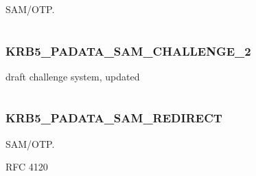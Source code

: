 \documentclass[letterpaper,10pt,english]{sphinxmanual}
\begin{document}
SAM/OTP.

\begin{tabulary}{\linewidth}{|L|L|}
\hline

 & 
\\
\hline\end{tabulary}



\subsubsection{KRB5\_PADATA\_SAM\_CHALLENGE\_2}
\label{appdev/refs/macros/KRB5_PADATA_SAM_CHALLENGE_2:krb5-padata-sam-challenge-2-data}\label{appdev/refs/macros/KRB5_PADATA_SAM_CHALLENGE_2:krb5-padata-sam-challenge-2}\label{appdev/refs/macros/KRB5_PADATA_SAM_CHALLENGE_2::doc}

\begin{fulllineitems}
\label{appdev/refs/macros/KRB5_PADATA_SAM_CHALLENGE_2:KRB5_PADATA_SAM_CHALLENGE_2}
\end{fulllineitems}


draft challenge system, updated

\begin{tabulary}{\linewidth}{|L|L|}
\hline

 & 
\\
\hline\end{tabulary}



\subsubsection{KRB5\_PADATA\_SAM\_REDIRECT}
\label{appdev/refs/macros/KRB5_PADATA_SAM_REDIRECT::doc}\label{appdev/refs/macros/KRB5_PADATA_SAM_REDIRECT:krb5-padata-sam-redirect-data}\label{appdev/refs/macros/KRB5_PADATA_SAM_REDIRECT:krb5-padata-sam-redirect}

\begin{fulllineitems}
\label{appdev/refs/macros/KRB5_PADATA_SAM_REDIRECT:KRB5_PADATA_SAM_REDIRECT}
\end{fulllineitems}


SAM/OTP.

RFC 4120
\end{document}
